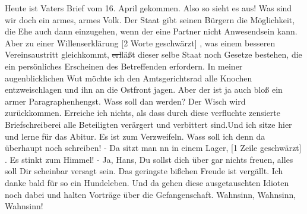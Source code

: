 \def\day{29. Juli 1944}
\mktitle

Heute ist Vaters Brief vom 16. April gekommen.
Also so sieht es aus!
Was sind wir doch ein armes, armes Volk.
Der Staat gibt seinen B\"{u}rgern die M\"{o}glichkeit, die Ehe auch dann einzugehen, wenn der eine Partner nicht Anwesendsein kann.
Aber zu einer Willenserkl\"{a}rung {\color{red} [2 Worte geschw\"{a}rzt] }, was einem besseren Vereinsaustritt gleichkommt, \st{erl}l\"{a}{\ss}t dieser selbe Staat noch Gesetze bestehen, die ein pers\"{o}nliches Erscheinen des Betreffenden erfordern.
In meiner augenblicklichen Wut m\"{o}chte ich den Amtsgerichtsrad alle Knochen entzweischlagen und ihn an die Ostfront jagen.
Aber der ist ja auch blo{\ss} ein armer Paragraphenhengst.
Wass soll dan werden?
Der Wisch wird zur\"{u}ckkommen.
Erreiche ich nichts, als dass durch diese verfluchte zensierte Briefschreiberei alle Beteiligten ver\"{a}rgert und verbittert sind.Und ich sitze hier und lerne f\"{u}r das Abitur.
Es ist zum Verzweifeln.
Wass soll ich denn da \"{u}berhaupt noch schreiben!
- Da sitzt man nn in einem Lager, {\color{red} [1 Zeile geschw\"{a}rzt] }.
Es stinkt zum Himmel!
- Ja, Hans, Du sollst dich \"{u}ber gar nichts freuen, alles soll Dir scheinbar versagt sein.
Das geringste bi{\ss}chen Freude ist verg\"{a}llt.
Ich danke bald f\"{u}r so ein Hundeleben.
Und da gehen diese ausgetauschten Idioten noch dabei und halten Vortr\"{a}ge \"{u}ber die Gefangenschaft.
Wahnsinn, Wahnsinn, Wahnsinn!

\clearpage
